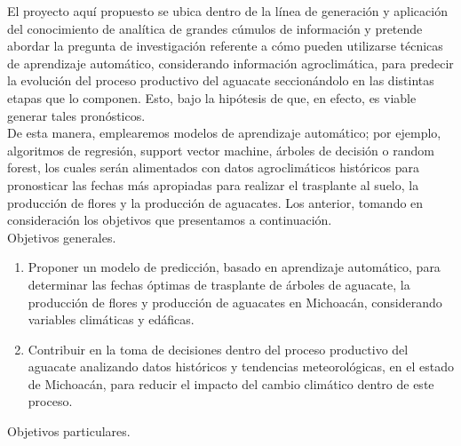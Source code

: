 El proyecto aquí propuesto se ubica dentro de la línea de generación y aplicación del conocimiento de analítica de grandes cúmulos de información y pretende abordar la pregunta de investigación referente a cómo pueden utilizarse técnicas de aprendizaje automático, considerando información agroclimática, para predecir la evolución del proceso productivo del aguacate seccionándolo en las distintas etapas que lo componen. Esto, bajo la hipótesis de que, en efecto, es viable generar tales pronósticos.\\

De esta manera, emplearemos modelos de aprendizaje automático; por ejemplo, algoritmos de regresión, support vector machine, árboles de decisión o random forest, los cuales serán alimentados con datos agroclimáticos históricos para pronosticar las fechas más apropiadas para realizar el trasplante al suelo, la producción de flores y la producción de aguacates. Los anterior, tomando en consideración los objetivos que presentamos a continuación.\\

Objetivos generales.

\begin{enumerate}
    \item Proponer un modelo de predicción, basado en aprendizaje automático, para determinar las fechas óptimas de trasplante de árboles de aguacate, la producción de flores y producción de aguacates en Michoacán, considerando variables climáticas y edáficas.
    \item Contribuir en la toma de decisiones dentro del proceso productivo del aguacate analizando datos históricos y tendencias meteorológicas, en el estado de Michoacán, para reducir el impacto del cambio climático dentro de este proceso.
\end{enumerate}

Objetivos particulares.

